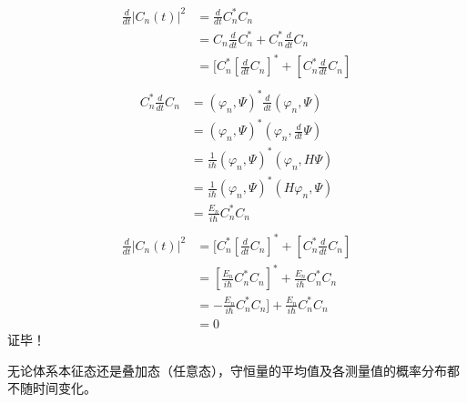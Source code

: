 \begin{frame} [allowframebreaks=]
    $$\begin{aligned}
      \frac{d}{dt} |C_n(t)|^2 &= \frac{d}{dt} C_n^* C_n \\
      &=C_n \frac{d}{dt} C_n^*  +  C_n^*\frac{d}{dt}C_n \\
      &=[C_n^*[\frac{d}{dt} C_n]^*  +  [C_n^*\frac{d}{dt}C_n] \\
    \end{aligned}$$
    $$\begin{aligned}
      C_n^*\frac{d}{dt}C_n&= (\varphi_n, \Psi)^* \frac{d}{dt}(\varphi_n, \Psi) \\
      &= (\varphi_n, \Psi)^* (\varphi_n, \frac{d}{dt}\Psi) \\
      &= \frac{1}{i\hbar}(\varphi_n, \Psi)^* (\varphi_n, H\Psi) \\
      &= \frac{1}{i\hbar}(\varphi_n, \Psi)^* (H\varphi_n, \Psi) \\
      &= \frac{E_n}{i\hbar}C_n ^* C_n \\
    \end{aligned}$$
    $$\begin{aligned}
        \frac{d}{dt} |C_n(t)|^2 &= [C_n^*[\frac{d}{dt} C_n]^*  +  [C_n^*\frac{d}{dt}C_n] \\
        &= [\frac{E_n}{i\hbar}C_n ^* C_n ]^* + \frac{E_n}{i\hbar}C_n ^* C_n \\
        &= -\frac{E_n}{i\hbar}C_n ^* C_n ] + \frac{E_n}{i\hbar}C_n ^* C_n \\
        &=0
    \end{aligned}$$
      证毕！
    \begin{tcolorbox}[colback=yellow!5,colframe=red!75!black,title=结论：]
        无论体系本征态还是叠加态（任意态），守恒量的平均值及各测量值的概率分布都不随时间变化。         
    \end{tcolorbox}
\end{frame}

